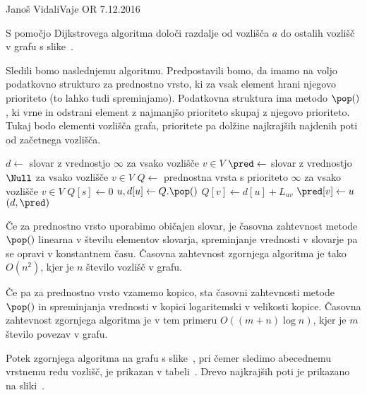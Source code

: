 \begin{naloga}{Janoš Vidali}{Vaje OR 7.12.2016}
\begin{vprasanje}
S pomočjo Dijkstrovega algoritma
določi razdalje od vozlišča $a$ do ostalih vozlišč
v grafu s slike~\fig.

\begin{slika}
\pgfslika
{}
\end{slika}
\end{vprasanje}


\begin{odgovor}
Sledili bomo naslednjemu algoritmu.
Predpostavili bomo,
da imamo na voljo podatkovno strukturo za prednostno vrsto,
ki za vsak element hrani njegovo prioriteto (to lahko tudi spreminjamo).
Podatkovna struktura ima metodo $\pop()$,
ki vrne in odstrani element z najmanjšo prioriteto
skupaj z njegovo prioriteto.
Tukaj bodo elementi vozlišča grafa,
prioritete pa dolžine najkrajših najdenih poti od začetnega vozlišča.
\begin{small}
\begin{algorithmic}
    \State $d \gets$ slovar z vrednostjo $\infty$ za vsako vozlišče $v \in V$
    \State $\pred \gets$ slovar z vrednostjo $\Null$
        za vsako vozlišče $v \in V$
	\State $Q \gets$ prednostna vrsta
        s prioriteto $\infty$ za vsako vozlišče $v \in V$
	\State $Q[s] \gets 0$
		\State $u, d[u] \gets Q.\pop()$
				\State $Q[v] \gets d[u] + L_{uv}$
                \State $\pred[v] \gets u$
			\EndIf
		\EndFor
	\EndWhile
    \State \Return $(d, \pred)$
\EndFunction
\end{algorithmic}
\end{small}
Če za prednostno vrsto uporabimo običajen slovar,
je časovna zahtevnost metode $\pop()$ linearna v številu elementov slovarja,
spreminjanje vrednosti v slovarje pa se opravi v konstantnem času.
Časovna zahtevnost zgornjega algoritma je tako $O(n^2)$,
kjer je $n$ število vozlišč v grafu.

Če pa za prednostno vrsto vzamemo kopico,
sta časovni zahtevnosti metode $\pop()$ in spreminjanja vrednosti v kopici
logaritemski v velikosti kopice.
Časovna zahtevnost zgornjega algoritma je v tem primeru $O((m+n) \log n)$,
kjer je $m$ število povezav v grafu.

Potek zgornjega algoritma na grafu s slike~\fig,
pri čemer sledimo abecednemu vrstnemu redu vozlišč,
je prikazan v tabeli~\tab.
Drevo najkrajših poti je prikazano na sliki~.


\end{odgovor}
\end{naloga}
